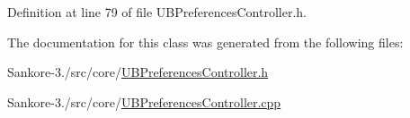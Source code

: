 Definition at line 79 of file U\-B\-Preferences\-Controller.\-h.



The documentation for this class was generated from the following files\-:\begin{DoxyCompactItemize}
\item 
Sankore-\/3./src/core/\hyperlink{_u_b_preferences_controller_8h}{U\-B\-Preferences\-Controller.\-h}\item 
Sankore-\/3./src/core/\hyperlink{_u_b_preferences_controller_8cpp}{U\-B\-Preferences\-Controller.\-cpp}\end{DoxyCompactItemize}

